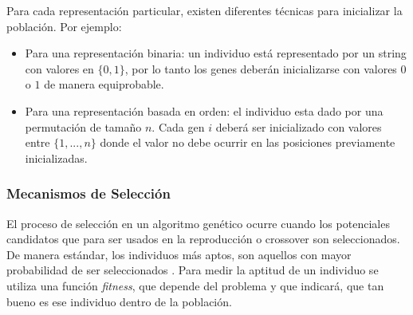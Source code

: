 Para cada representación particular, existen diferentes técnicas para inicializar la población. Por ejemplo:

\begin{itemize}
    \item Para una representación binaria: un individuo está representado por un string con valores en $\{0, 1\}$, por lo tanto los genes deberán inicializarse con valores $0$ o $1$ de manera equiprobable.
    \item Para una representación basada en orden: el individuo esta dado por una permutación de tamaño $n$. Cada gen $i$ deberá ser inicializado con valores entre $\{1, ..., n\}$ donde el valor no debe ocurrir en las posiciones previamente inicializadas.
\end{itemize}

\subsubsection{Mecanismos de Selección}
El proceso de selección en un algoritmo genético ocurre cuando los potenciales candidatos que para ser usados en la reproducción o  crossover son seleccionados. De manera estándar, los individuos más aptos, son aquellos con mayor probabilidad de ser seleccionados \cite{grosan2011intelligent}. Para medir la aptitud de un individuo se utiliza una función  \emph{fitness},  que depende del problema y que indicará,  que tan bueno es ese  individuo dentro de la población.

